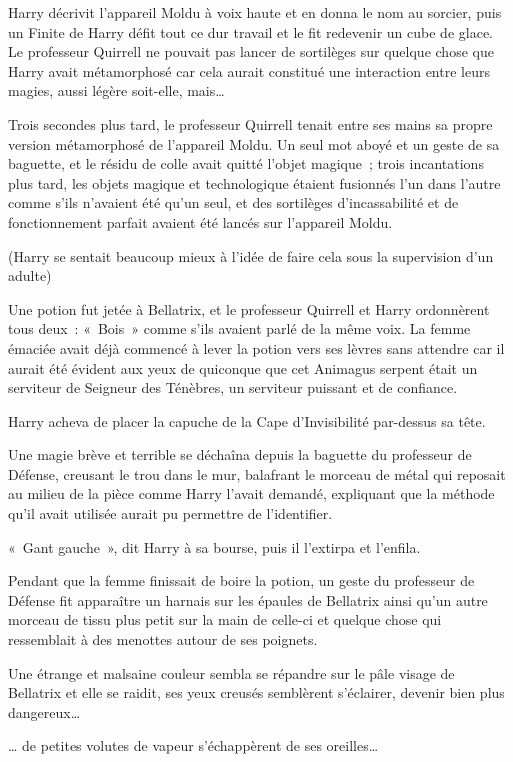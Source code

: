Harry décrivit l'appareil Moldu à voix haute et en donna le nom au sorcier, puis un Finite de Harry défit tout ce dur travail et le fit redevenir un cube de glace. Le professeur Quirrell ne pouvait pas lancer de sortilèges sur quelque chose que Harry avait métamorphosé car cela aurait constitué une interaction entre leurs magies, aussi légère soit-elle, mais…

Trois secondes plus tard, le professeur Quirrell tenait entre ses mains sa propre version métamorphosé de l'appareil Moldu. Un seul mot aboyé et un geste de sa baguette, et le résidu de colle avait quitté l'objet magique~; trois incantations plus tard, les objets magique et technologique étaient fusionnés l'un dans l'autre comme s'ils n'avaient été qu'un seul, et des sortilèges d'incassabilité et de fonctionnement parfait avaient été lancés sur l'appareil Moldu.

(Harry se sentait beaucoup mieux à l'idée de faire cela sous la supervision d'un adulte)

Une potion fut jetée à Bellatrix, et le professeur Quirrell et Harry ordonnèrent tous deux~: «~Bois~» comme s'ils avaient parlé de la même voix. La femme émaciée avait déjà commencé à lever la potion vers ses lèvres sans attendre car il aurait été évident aux yeux de quiconque que cet Animagus serpent était un serviteur de Seigneur des Ténèbres, un serviteur puissant et de confiance.

Harry acheva de placer la capuche de la Cape d'Invisibilité par-dessus sa tête.

Une magie brève et terrible se déchaîna depuis la baguette du professeur de Défense, creusant le trou dans le mur, balafrant le morceau de métal qui reposait au milieu de la pièce comme Harry l'avait demandé, expliquant que la méthode qu'il avait utilisée aurait pu permettre de l'identifier.

«~Gant gauche~», dit Harry à sa bourse, puis il l'extirpa et l'enfila.

Pendant que la femme finissait de boire la potion, un geste du professeur de Défense fit apparaître un harnais sur les épaules de Bellatrix ainsi qu'un autre morceau de tissu plus petit sur la main de celle-ci et quelque chose qui ressemblait à des menottes autour de ses poignets.

Une étrange et malsaine couleur sembla se répandre sur le pâle visage de Bellatrix et elle se raidit, ses yeux creusés semblèrent s'éclairer, devenir bien plus dangereux…

… de petites volutes de vapeur s'échappèrent de ses oreilles…

